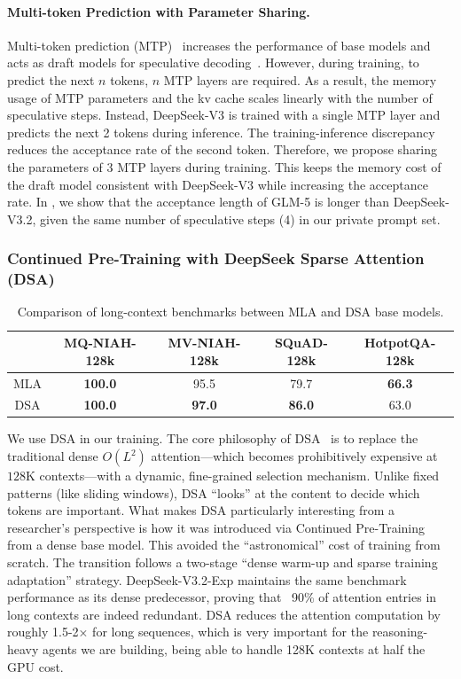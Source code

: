 \paragraph{Multi-token Prediction with Parameter Sharing.} Multi-token prediction (MTP)~\cite{gloeckle2024mtp,liu2024deepseek} increases the performance of base models and acts as draft models for speculative decoding~\cite{leviathan2023spec}. However, during training, to predict the next $n$ tokens, $n$ MTP layers are required. As a result, the memory usage of MTP parameters and the kv cache scales linearly with the number of speculative steps. Instead, DeepSeek-V3 is trained with a single MTP layer and predicts the next 2 tokens during inference. The training-inference discrepancy reduces the acceptance rate of the second token. Therefore, we propose sharing the parameters of 3 MTP layers during training. This keeps the memory cost of the draft model consistent with DeepSeek-V3 while increasing the acceptance rate. In , we show that the acceptance length of GLM-5 is longer than DeepSeek-V3.2, given the same number of speculative steps (4) in our private prompt set.

\subsubsection{Continued Pre-Training with DeepSeek Sparse Attention (DSA)}
\begin{table}[!ht]
    \centering
    \caption{Comparison of long-context benchmarks between MLA and DSA base models.}
    \begin{tabular}{c|cccc}
    \toprule
     & MQ-NIAH-128k & MV-NIAH-128k & SQuAD-128k & HotpotQA-128k \\
    \midrule
    MLA & \textbf{100.0} & 95.5 & 79.7 & \textbf{66.3} \\
    DSA & \textbf{100.0} & \textbf{97.0} & \textbf{86.0} & 63.0\\
    \bottomrule
    \end{tabular}
    \label{tab:dsa}
\end{table}
We use DSA in our training. 
The core philosophy of DSA~\cite{deepseekai2025deepseekv32pushingfrontieropen} is to replace the traditional dense $O(L^2)$ attention—which becomes prohibitively expensive at $128\text{K}$ contexts—with a dynamic, fine-grained selection mechanism. Unlike fixed patterns (like sliding windows), DSA ``looks'' at the content to decide which tokens are important.
What makes DSA particularly interesting from a researcher's perspective is how it was introduced via Continued Pre-Training from a dense base model. This avoided the ``astronomical'' cost of training from scratch. The transition follows a two-stage ``dense warm-up and sparse training adaptation'' strategy. DeepSeek-V3.2-Exp maintains the same benchmark performance as its dense predecessor, proving that ~90\% of attention entries in long contexts are indeed redundant.
DSA reduces the attention computation by roughly 1.5-2× for long sequences, which is very important for the reasoning-heavy agents we are building, being able to handle 128K contexts at half the GPU cost.

